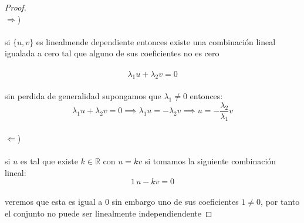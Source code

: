\documentclass[11pt,letterpaper]{article}
\newcommand{\R}{\mathbb{R}}
\begin{document}
\begin{proof}\,\\
   $\Rightarrow$)\,\\
   \,\\
   si $\{u,v\}$ es linealmende dependiente entonces existe una combinaci\'on lineal igualada a cero tal que
   alguno de sus coeficientes no es cero\,\\
   \,\\
   \begin{equation*}
    \lambda_1u+\lambda_2 v=0
   \end{equation*}\,\\
   sin perdida de generalidad supongamos que $\lambda_1\neq 0$
   entonces:\,\\
   \begin{equation*}
    \lambda_1u+\lambda_2v=0\implies \lambda_1u=-\lambda_2v\implies u=-\frac{\lambda_2}{\lambda_1}v
   \end{equation*}\,\\
   $\Leftarrow$)\,\\
   \,\\
   si $u$ es tal que existe $k\in \R$ con $u=kv$ si tomamos la siguiente combinaci\'on lineal:\,\\
   \begin{equation*}
    1\,u-kv=0
   \end{equation*}\,\\
   veremos que esta es igual a $0$ sin embargo uno de sus coeficientes $1\neq 0$, por tanto el conjunto no puede ser linealmente independiendente
\end{proof}\,\\
\end{document}
